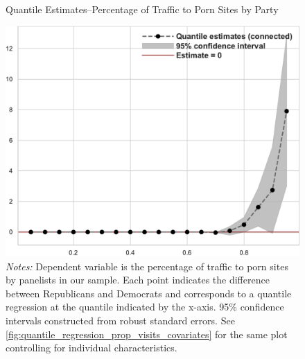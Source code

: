 \documentclass[12pt, letterpaper]{article}
\begin{document}
\begin{figure}
	\centering
	\caption{Quantile Estimates--Percentage of Traffic to Porn Sites by Party}
	\includegraphics[width=.6\linewidth]{../figs/quantile_reg_proportion_visits_adult.pdf}
	\caption*{\footnotesize \emph{Notes:} 
		Dependent variable is the percentage of traffic to porn sites by panelists in our sample.
		Each point indicates the difference between Republicans and Democrats and corresponds to a quantile regression at the quantile indicated by the x-axis.
		95\% confidence intervals constructed from robust standard errors.
		See \cref{fig:quantile_regression_prop_visits_covariates} for the same plot controlling for individual characteristics.
	}
	\label{fig:quantile_regression_prop_visits}
\end{figure}
\end{document}
